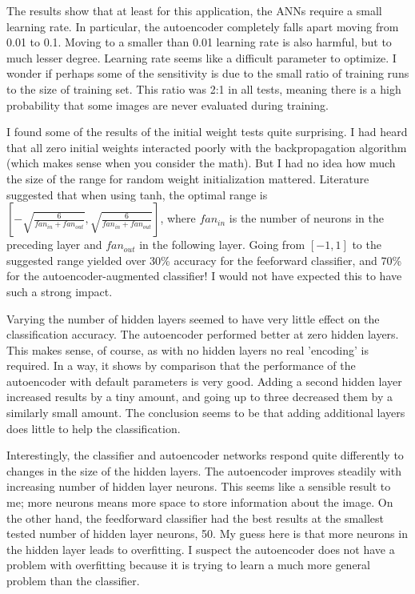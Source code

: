 \documentclass[english]{tktltiki}
\begin{document}
The results show that at least for this application, the ANNs require a small learning rate.  In particular, the autoencoder completely falls apart moving from 0.01 to 0.1.  Moving to a smaller than 0.01 learning rate is also harmful, but to much lesser degree.  Learning rate seems like a difficult parameter to optimize.  I wonder if perhaps some of the sensitivity is due to the small ratio of training runs to the size of training set.  This ratio was 2:1 in all tests, meaning there is a high probability that some images are never evaluated during training.  

I found some of the results of the initial weight tests quite surprising.  I had heard that all zero initial weights interacted poorly with the backpropagation algorithm (which makes sense when you consider the math).  But I had no idea how much the size of the range for random weight initialization mattered.  Literature \cite{glorot2010understanding} suggested that when using tanh, the optimal range is $[-\sqrt{\frac{6}{fan_{in}+fan_{out}}}, \sqrt{\frac{6}{fan_{in}+fan_{out}}}]$, where $fan_{in}$ is the number of neurons in the preceding layer and $fan_{out}$ in the following layer.  Going from $[-1, 1]$ to the suggested range yielded over 30\% accuracy for the feeforward classifier, and 70\% for the autoencoder-augmented classifier! I would not have expected this to have such a strong impact. 

Varying the number of hidden layers seemed to have very little effect on the classification accuracy.  The autoencoder performed better at zero hidden layers.  This makes sense, of course, as with no hidden layers no real 'encoding' is required.  In a way, it shows by comparison that the performance of the autoencoder with default parameters is very good.  Adding a second hidden layer increased results by a tiny amount, and going up to three decreased them by a similarly small amount.  The conclusion seems to be that adding additional layers does little to help the classification.  

Interestingly, the classifier and autoencoder networks respond quite differently to changes in the size of the hidden layers.  The autoencoder improves steadily with increasing number of hidden layer neurons.  This seems like a sensible result to me; more neurons means more space to store information about the image.  On the other hand, the feedforward classifier had the best results at the smallest tested number of hidden layer neurons, 50.  My guess here is that more neurons in the hidden layer leads to overfitting.  I suspect the autoencoder does not have a problem with overfitting because it is trying to learn a much more general problem than the classifier.  
\end{document}
